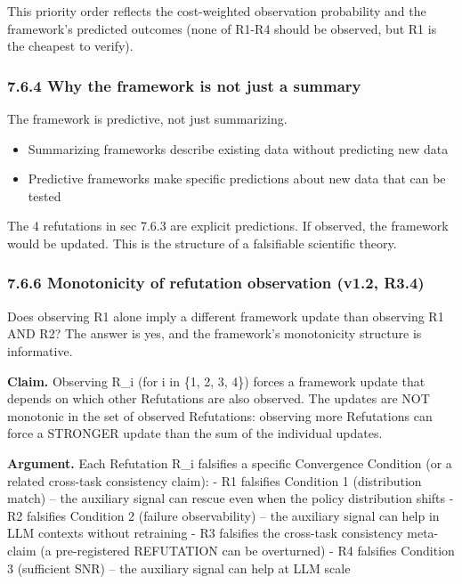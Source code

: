 \documentclass[11pt]{article}
\begin{document}
This priority order reflects the cost-weighted observation probability
and the framework's predicted outcomes (none of R1-R4 should be
observed, but R1 is the cheapest to verify).

\subsubsection{7.6.4 Why the framework is not just a
summary}\label{why-the-framework-is-not-just-a-summary}

The framework is predictive, not just summarizing.

\begin{itemize}

\item
  Summarizing frameworks describe existing data without predicting new
  data
\item
  Predictive frameworks make specific predictions about new data that
  can be tested
\end{itemize}

The 4 refutations in sec 7.6.3 are explicit predictions. If observed,
the framework would be updated. This is the structure of a falsifiable
scientific theory.

\subsubsection{7.6.6 Monotonicity of refutation observation (v1.2,
R3.4)}\label{monotonicity-of-refutation-observation-v1.2-r3.4}

Does observing R1 alone imply a different framework update than
observing R1 AND R2? The answer is yes, and the framework's monotonicity
structure is informative.

\textbf{Claim.} Observing R\_i (for i in \{1, 2, 3, 4\}) forces a
framework update that depends on which other Refutations are also
observed. The updates are NOT monotonic in the set of observed
Refutations: observing more Refutations can force a STRONGER update than
the sum of the individual updates.

\textbf{Argument.} Each Refutation R\_i falsifies a specific Convergence
Condition (or a related cross-task consistency claim): - R1 falsifies
Condition 1 (distribution match) -- the auxiliary signal can rescue even
when the policy distribution shifts - R2 falsifies Condition 2 (failure
observability) -- the auxiliary signal can help in LLM contexts without
retraining - R3 falsifies the cross-task consistency meta-claim (a
pre-registered REFUTATION can be overturned) - R4 falsifies Condition 3
(sufficient SNR) -- the auxiliary signal can help at LLM scale
\end{document}
